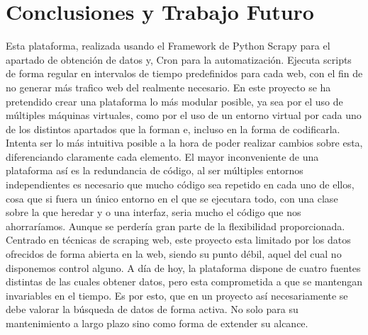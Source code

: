 \chapter[Conclusiones y Trabajo Futuro]{Conclusiones y Trabajo Futuro}
\label{Chap6}

Esta plataforma, realizada usando el Framework de Python Scrapy para el apartado de obtención de datos y, Cron para la automatización. Ejecuta scripts de forma regular en intervalos de tiempo predefinidos para cada web, con el fin de no generar más trafico web del realmente necesario.\newline
\newline
En este proyecto se ha pretendido crear una plataforma lo más modular posible, ya sea por el uso de múltiples máquinas virtuales, como por el uso de un entorno virtual por cada uno de los distintos apartados que la forman e, incluso en la forma de codificarla. Intenta ser lo más intuitiva posible a la hora de poder realizar cambios sobre esta, diferenciando claramente cada elemento.\newline
\newline
El mayor inconveniente de una plataforma así es la redundancia de código, al ser múltiples entornos independientes es necesario que mucho código sea repetido en cada uno de ellos, cosa que si fuera un único entorno en el que se ejecutara todo, con una clase sobre la que heredar y o una interfaz, seria mucho el código que nos ahorraríamos. Aunque se perdería gran parte de la flexibilidad proporcionada.\newline
\newline
Centrado en técnicas de scraping web, este proyecto esta limitado por los datos ofrecidos de forma abierta en la web, siendo su punto débil, aquel del cual no disponemos control alguno. A día de hoy, la plataforma dispone de cuatro fuentes distintas de las cuales obtener datos, pero esta comprometida a que se mantengan invariables en el tiempo. Es por esto, que en un proyecto así necesariamente se debe valorar la búsqueda de datos de forma activa. No solo para su mantenimiento a largo plazo sino como forma de extender su alcance.